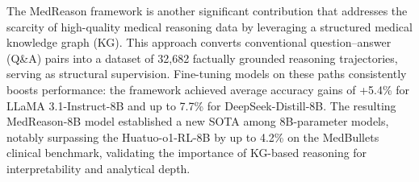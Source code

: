 \documentclass[conference]{IEEEtran}
\begin{document}

The MedReason \cite{b12} framework is another significant contribution that addresses the scarcity of high-quality medical reasoning data by leveraging a structured medical knowledge graph (KG). This approach converts conventional question–answer (Q\&A) pairs into a dataset of 32,682 factually grounded reasoning trajectories, serving as structural supervision. Fine-tuning models on these paths consistently boosts performance: the framework achieved average accuracy gains of +5.4\% for LLaMA 3.1-Instruct-8B and up to 7.7\% for DeepSeek-Distill-8B. The resulting MedReason-8B model established a new SOTA among 8B-parameter models, notably surpassing the Huatuo-o1-RL-8B by up to 4.2\% on the MedBullets clinical benchmark, validating the importance of KG-based reasoning for interpretability and analytical depth.

\end{document}
